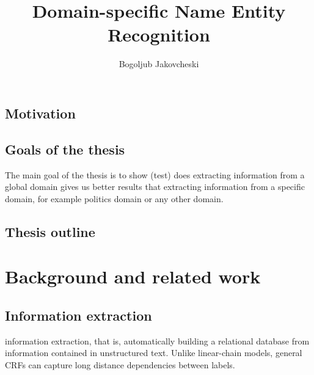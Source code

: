\documentclass[thesis=M,english]{FITthesis}[2018/05/30]
\title{Domain-specific Name Entity Recognition}
\author{Bogoljub Jakovcheski} %
\begin{document}

\begin{introduction}

\section{Motivation}

\section{Goals of the thesis}
	The main goal of the thesis is to show (test) does extracting information from a 	global domain gives us better results that extracting information from a specific domain, for example politics domain or any other domain.
\section{Thesis outline}
	
\end{introduction}

\chapter{Background and related work}\label{textcompr}

	

\section{Information extraction}
information extraction, that is, automatically building a relational database from information contained in unstructured text. Unlike linear-chain models, general CRFs can capture long distance dependencies between labels. 
\end{document}
